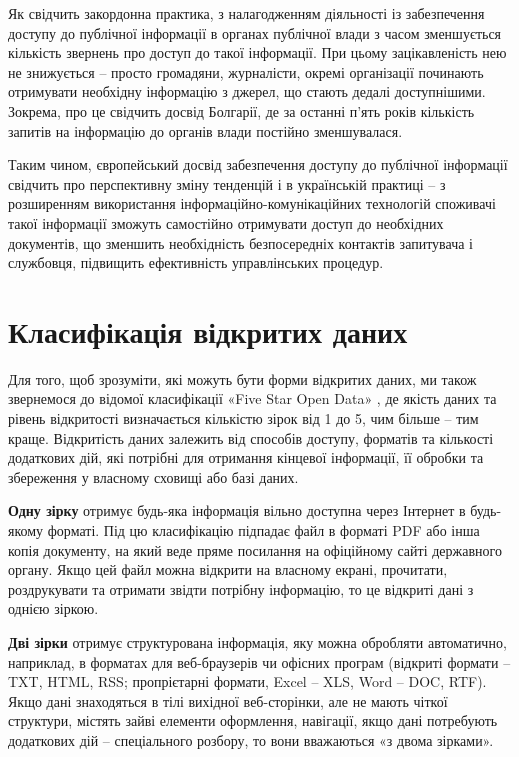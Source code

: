 Як свідчить закордонна практика, з налагодженням діяльності із
забезпечення доступу до публічної інформації в органах публічної
влади з часом зменшується кількість звернень про доступ до такої
інформації. При цьому зацікавленість нею не знижується – просто
громадяни, журналісти, окремі організації починають отримувати
необхідну інформацію з джерел, що стають дедалі доступнішими.
Зокрема, про це свідчить досвід Болгарії, де за останні п’ять років
кількість запитів на інформацію до органів влади постійно зменшувалася.

Таким чином, європейський досвід забезпечення доступу до
публічної інформації свідчить про перспективну зміну тенденцій і в
українській практиці – з розширенням використання інформаційно-комунікаційних
технологій споживачі такої інформації зможуть самостійно отримувати доступ
до необхідних документів, що зменшить необхідність безпосередніх контактів
запитувача і службовця, підвищить ефективність управлінських процедур.

\section{Класифікація відкритих даних}

Для того, щоб зрозуміти, які можуть бути форми відкритих даних, ми також звернемося до
відомої класифікації «Five Star Open Data» \cite{5StarData}, де якість даних та рівень
відкритості визначається кількістю зірок від 1 до 5, чим більше – тим краще. Відкритість
даних залежить від способів доступу, форматів та кількості додаткових дій, які потрібні для
отримання кінцевої інформації, її обробки та збереження у власному сховищі або базі даних.

\textbf{Одну зірку} отримує будь-яка інформація вільно доступна через Інтернет в будь-якому
форматі. Під цю класифікацію підпадає файл в форматі PDF або інша копія
документу, на який веде пряме посилання на офіційному сайті державного органу. Якщо
цей файл можна відкрити на власному екрані, прочитати, роздрукувати та отримати звідти
потрібну інформацію, то це відкриті дані з однією зіркою.

\textbf{Дві зірки} отримує структурована інформація, яку можна обробляти автоматично, наприклад,
в форматах для веб-браузерів чи офісних програм (відкриті формати – TXT, HTML,
RSS; пропрієтарні формати, Excel – XLS, Word – DOC, RTF). Якщо дані знаходяться в тілі
вихідної веб-сторінки, але не мають чіткої структури, містять зайві елементи оформлення,
навігації, якщо дані потребують додаткових дій – спеціального розбору, то вони
вважаються «з двома зірками».

